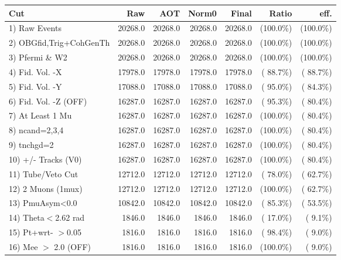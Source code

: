  \begin{table}[h!]\centering
 \begin{tabular}{||l||r|r|r|r|r|r||}
 \hline
 \hline
 Cut & Raw & AOT & Norm0 & Final & Ratio & eff.       \\
 \hline
  1) Raw Events           &      20268.0 &      20268.0 &      20268.0 &      20268.0 & (100.0\%) & (100.0\%) \\
  2) OBGfid,Trig+CohGenTh &      20268.0 &      20268.0 &      20268.0 &      20268.0 & (100.0\%) & (100.0\%) \\
  3) Pfermi \& W2         &      20268.0 &      20268.0 &      20268.0 &      20268.0 & (100.0\%) & (100.0\%) \\
  4) Fid. Vol. -X         &      17978.0 &      17978.0 &      17978.0 &      17978.0 & ( 88.7\%) & ( 88.7\%) \\
  5) Fid. Vol. -Y         &      17088.0 &      17088.0 &      17088.0 &      17088.0 & ( 95.0\%) & ( 84.3\%) \\
  6) Fid. Vol. -Z (OFF)   &      16287.0 &      16287.0 &      16287.0 &      16287.0 & ( 95.3\%) & ( 80.4\%) \\
  7) At Least 1 Mu        &      16287.0 &      16287.0 &      16287.0 &      16287.0 & (100.0\%) & ( 80.4\%) \\
  8) ncand=2,3,4          &      16287.0 &      16287.0 &      16287.0 &      16287.0 & (100.0\%) & ( 80.4\%) \\
  9) tnchgd=2             &      16287.0 &      16287.0 &      16287.0 &      16287.0 & (100.0\%) & ( 80.4\%) \\
 10) +/- Tracks (V0)      &      16287.0 &      16287.0 &      16287.0 &      16287.0 & (100.0\%) & ( 80.4\%) \\
 11) Tube/Veto Cut        &      12712.0 &      12712.0 &      12712.0 &      12712.0 & ( 78.0\%) & ( 62.7\%) \\
 12) 2 Muons (1mux)       &      12712.0 &      12712.0 &      12712.0 &      12712.0 & (100.0\%) & ( 62.7\%) \\
 13) PmuAsym<0.0          &      10842.0 &      10842.0 &      10842.0 &      10842.0 & ( 85.3\%) & ( 53.5\%) \\
 14) Theta$<$2.62 rad     &       1846.0 &       1846.0 &       1846.0 &       1846.0 & ( 17.0\%) & (  9.1\%) \\
 15) Pt+wrt- $>$0.05      &       1816.0 &       1816.0 &       1816.0 &       1816.0 & ( 98.4\%) & (  9.0\%) \\
 16) Mee $>$ 2.0  (OFF)   &       1816.0 &       1816.0 &       1816.0 &       1816.0 & (100.0\%) & (  9.0\%) \\

\end{tabular}
\end{table}
